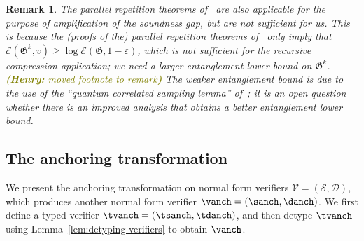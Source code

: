 \documentclass[11pt]{article}
\newtheorem{remark}[theorem]{Remark}
\theoremstyle{definition}
\newcommand{\eps}{\varepsilon}
\newcommand{\game}{\mathfrak{G}}
\newcommand{\sampler}{\mathcal{S}}
\newcommand{\decider}{\mathcal{D}}
\newcommand{\verifier}{\mathcal{V}}
\newcommand{\Ent}{\mathscr{E}}
\newcommand{\hnote}[1]{\textcolor{olive}{\small {\textbf{(Henry:} #1\textbf{) }}}}
\newcommand{\hnote}[1]{}
\begin{document}
\begin{remark}
The parallel repetition theorems of~\cite{dinur2015parallel,yuen2016parallel}
are also applicable for the purpose of amplification of the soundness gap, but are not
sufficient for us. This is because the (proofs of the) parallel repetition theorems
of~\cite{dinur2015parallel,yuen2016parallel} only imply that $\Ent(\game^k,v)
\geq \log \Ent(\game,1 - \eps)$, which is not sufficient for the recursive compression application; we need a larger entanglement lower bound 
on $\game^k$. \hnote{moved footnote to remark} The weaker entanglement bound is due to the use of the
  ``quantum correlated sampling lemma'' of~\cite{dinur2015parallel}; it is an open question whether there is
  an improved analysis that obtains a better entanglement lower bound.
\end{remark}


\subsection{The anchoring transformation} 
\label{sec:anchoring}

We present the anchoring transformation on normal form verifiers $\verifier = (\sampler,\decider)$,
which produces another normal form verifier $\vanch = (\sanch,\danch)$.
We first define a typed verifier $\tvanch = (\tsanch,
\tdanch)$, and then detype $\tvanch$ using
Lemma~\ref{lem:detyping-verifiers} to obtain $\vanch$.
\end{document}
